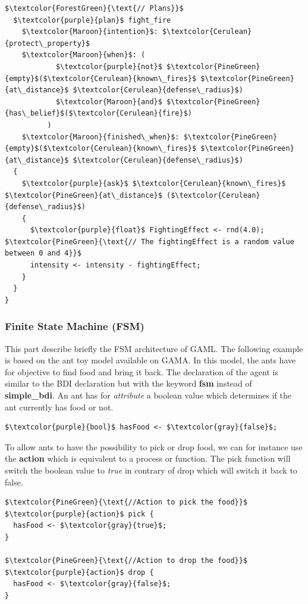 \documentclass[12pt, a4paper]{memoir} %
\begin{document}
\begin{lstlisting}[mathescape,caption=Exemple of BDI agent.,label=code:bdi]
  $\textcolor{ForestGreen}{\text{// Plans}}$
  $\textcolor{purple}{plan}$ fight_fire
    $\textcolor{Maroon}{intention}$: $\textcolor{Cerulean}{protect\_property}$
    $\textcolor{Maroon}{when}$: (
            $\textcolor{purple}{not}$ $\textcolor{PineGreen}{empty}$($\textcolor{Cerulean}{known\_fires}$ $\textcolor{PineGreen}{at\_distance}$ $\textcolor{Cerulean}{defense\_radius}$)
            $\textcolor{Maroon}{and}$ $\textcolor{PineGreen}{has\_belief}$($\textcolor{Cerulean}{fire}$)
          )
    $\textcolor{Maroon}{finished\_when}$: $\textcolor{PineGreen}{empty}$($\textcolor{Cerulean}{known\_fires}$ $\textcolor{PineGreen}{at\_distance}$ $\textcolor{Cerulean}{defense\_radius}$)
  {
    $\textcolor{purple}{ask}$ $\textcolor{Cerulean}{known\_fires}$ $\textcolor{PineGreen}{at\_distance}$ ($\textcolor{Cerulean}{defense\_radius}$)
    {
      $\textcolor{purple}{float}$ FightingEffect <- rnd(4.0); $\textcolor{PineGreen}{\text{// The fightingEffect is a random value between 0 and 4}}$
      intensity <- intensity - fightingEffect;
    }
  }
}
			\end{lstlisting}

		\subsubsection{Finite State Machine (FSM)}

			This part describe briefly the FSM architecture of GAML. The following example is based on the ant toy model available on GAMA.
			In this model, the ants have for objective to find food and bring it back.
			The declaration of the agent is similar to the BDI declaration but with the keyword \textbf{fsm} instead of \textbf{simple\_bdi}.
			An ant has for \textit{attribute} a boolean value which determines if the ant currently has food or not.

			\begin{lstlisting}[mathescape,caption=Ant attribute.,label=code:ant_attribute]
$\textcolor{purple}{bool}$ hasFood <- $\textcolor{gray}{false}$;
			\end{lstlisting}

			To allow ants to have the possibility to pick or drop food, we can for instance use the \textbf{action} which is
			equivalent to a process or function. The pick function will switch the boolean value to \textit{true} in contrary of
			drop which will switch it back to false.

			\begin{lstlisting}[mathescape,caption=Pick action.,label=code:pick]
$\textcolor{PineGreen}{\text{//Action to pick the food}}$
$\textcolor{purple}{action}$ pick {
  hasFood <- $\textcolor{gray}{true}$;
}

$\textcolor{PineGreen}{\text{//Action to drop the food}}$
$\textcolor{purple}{action}$ drop {
  hasFood <- $\textcolor{gray}{false}$;
}
			\end{lstlisting}
\end{document}

